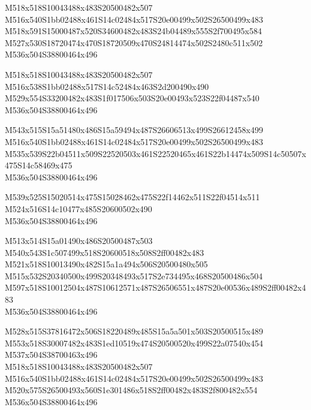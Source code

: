 \documentclass{article}
\begin{document}
\begin{multicols}{5}
\begin{center}

M518x518S10043488x483S20500482x507 %
\\M516x540S1bb02488x461S14c02484x517S20e00499x502S26500499x483 %
\\M518x591S15000487x520S34600482x483S24b04489x555S2f700495x584 %
\\M527x530S18720474x470S18720509x470S24814474x502S2480c511x502 %
\\M536x504S38800464x496 %

M518x518S10043488x483S20500482x507 %
\\M516x538S1bb02488x517S14c52484x463S2d200490x490 %
\\M529x554S33200482x483S1f017506x503S20e00493x523S22f04487x540 %
\\M536x504S38800464x496 %

M543x515S15a51480x486S15a59494x487S26606513x499S26612458x499 %
\\M516x540S1bb02488x461S14c02484x517S20e00499x502S26500499x483 %
\\M535x539S22b04511x509S22520503x461S22520465x461S22b14474x509S14c50507x475S14c58469x475 %
\\M536x504S38800464x496 %

M539x525S15020514x475S15028462x475S22f14462x511S22f04514x511 %
\\M524x516S14c10477x485S20600502x490 %
\\M536x504S38800464x496 %

M513x514S15a01490x486S20500487x503 %
\\M540x543S1c507499x518S20600518x508S2ff00482x483 %
\\M521x518S10013490x482S15a1a494x506S20500480x505 %
\\M515x532S20340500x499S20348493x517S2e734495x468S20500486x504 %
\\M597x518S10012504x487S10612571x487S26506551x487S20e00536x489S2ff00482x483 %
\\M536x504S38800464x496 %

M528x515S37816472x506S18220489x485S15a5a501x503S20500515x489 %
\\M553x518S30007482x483S1ed10519x474S20500520x499S22a07540x454 %
\\M537x504S38700463x496 %
\\M518x518S10043488x483S20500482x507 %
\\M516x540S1bb02488x461S14c02484x517S20e00499x502S26500499x483 %
\\M520x575S26500493x560S1e301486x518S2ff00482x483S2f800482x554 %
\\M536x504S38800464x496 %


\end{center}
\end{multicols}
\end{document}
